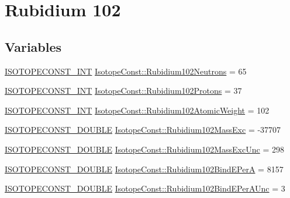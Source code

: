 \hypertarget{group___isotope_const-_rubidium-_rb102}{}\section{Rubidium 102}
\label{group___isotope_const-_rubidium-_rb102}
\subsection*{Variables}
\begin{DoxyCompactItemize}
\item 
\mbox{\hyperlink{group___isotope_const-_macros_ga5f18360b3e99483a35c32d789e62621c}{I\+S\+O\+T\+O\+P\+E\+C\+O\+N\+S\+T\+\_\+\+I\+NT}} \mbox{\hyperlink{group___isotope_const-_rubidium-_rb102_gad1f9aa174903c88ef3a44aab9ed0537b}{Isotope\+Const\+::\+Rubidium102\+Neutrons}} = 65
\item 
\mbox{\hyperlink{group___isotope_const-_macros_ga5f18360b3e99483a35c32d789e62621c}{I\+S\+O\+T\+O\+P\+E\+C\+O\+N\+S\+T\+\_\+\+I\+NT}} \mbox{\hyperlink{group___isotope_const-_rubidium-_rb102_gae5bdb502a186df1a4aae89d92e2ee92b}{Isotope\+Const\+::\+Rubidium102\+Protons}} = 37
\item 
\mbox{\hyperlink{group___isotope_const-_macros_ga5f18360b3e99483a35c32d789e62621c}{I\+S\+O\+T\+O\+P\+E\+C\+O\+N\+S\+T\+\_\+\+I\+NT}} \mbox{\hyperlink{group___isotope_const-_rubidium-_rb102_ga27488360ab1decec5e6429b43548e9d0}{Isotope\+Const\+::\+Rubidium102\+Atomic\+Weight}} = 102
\item 
\mbox{\hyperlink{group___isotope_const-_macros_ga8f45a7272ce02c0b4c65c44636ed719a}{I\+S\+O\+T\+O\+P\+E\+C\+O\+N\+S\+T\+\_\+\+D\+O\+U\+B\+LE}} \mbox{\hyperlink{group___isotope_const-_rubidium-_rb102_ga0b29365399c72c5c0128f61fe129de4a}{Isotope\+Const\+::\+Rubidium102\+Mass\+Exc}} = -\/37707
\item 
\mbox{\hyperlink{group___isotope_const-_macros_ga8f45a7272ce02c0b4c65c44636ed719a}{I\+S\+O\+T\+O\+P\+E\+C\+O\+N\+S\+T\+\_\+\+D\+O\+U\+B\+LE}} \mbox{\hyperlink{group___isotope_const-_rubidium-_rb102_ga33f974397e5ec1f5e25bcd3edda32e28}{Isotope\+Const\+::\+Rubidium102\+Mass\+Exc\+Unc}} = 298
\item 
\mbox{\hyperlink{group___isotope_const-_macros_ga8f45a7272ce02c0b4c65c44636ed719a}{I\+S\+O\+T\+O\+P\+E\+C\+O\+N\+S\+T\+\_\+\+D\+O\+U\+B\+LE}} \mbox{\hyperlink{group___isotope_const-_rubidium-_rb102_ga9c94b272dc60318ce7318634dd0df015}{Isotope\+Const\+::\+Rubidium102\+Bind\+E\+PerA}} = 8157
\item 
\mbox{\hyperlink{group___isotope_const-_macros_ga8f45a7272ce02c0b4c65c44636ed719a}{I\+S\+O\+T\+O\+P\+E\+C\+O\+N\+S\+T\+\_\+\+D\+O\+U\+B\+LE}} \mbox{\hyperlink{group___isotope_const-_rubidium-_rb102_ga677798cd7887cad48c0eef2c04608328}{Isotope\+Const\+::\+Rubidium102\+Bind\+E\+Per\+A\+Unc}} = 3

\end{DoxyCompactItemize}
